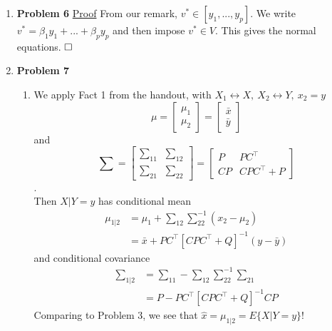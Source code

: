 \documentclass[letterpaper]{article}
\begin{document}
\begin{enumerate}
\begin{enumerate}
\underline{Remark} $v^* \perp [y_1, ..., y_p]^\perp \iff v^* \in ([y_1, ..., y_p]^\perp)^\perp \iff v^* \in [y_1, ..., y_p]$\\

\underline{Because} $\mathcal{X} = [y_1, ..., y_p] \oplus [y_1, ..., y_p]^\perp \hfill \bigtriangleup$\\


\end{enumerate}


\vspace*{1cm}

\item \textbf{Problem 6} \underline{Proof} From our remark, $v^* \in [y_1, ..., y_p]$. We write $v^* = \beta_1 y_1 + ... +\beta_p y_p$ and then impose $v^* \in V$. This gives the normal equations. $\hfill \square$
    
    \vspace*{1cm}

\item \textbf{Problem 7}
\begin{enumerate}
\setlength{\itemsep}{.1in}
\renewcommand{\labelenumi}{(\alph{enumi})}
\item We apply Fact 1 from the handout, with $X_1 \leftrightarrow X, ~X_2 \leftrightarrow Y, ~x_2 = y$
$$\mu = \begin{bmatrix} \mu_1 \\ \mu_2 \end{bmatrix} = \begin{bmatrix} \bar{x} \\ \bar{y}\end{bmatrix}$$
and $$\sum = \left[\begin{array}{cc}
\sum_{11} & \sum_{12} \\
\sum_{21} & \sum_{22} \end{array}\right] =
\left[\begin{array}{cc}
P & PC^\top \\
CP & CPC^\top +P \end{array}\right]$$.\\

Then $X|Y=y$ has conditional mean
$$\begin{aligned}
\mu_{1|2} &= \mu_1 + \textstyle \sum_{12} \sum_{22}^{-1}(x_2-\mu_2) \\
&= \bar{x} + PC^\top[CPC^\top +Q]^{-1}(y-\bar{y})
\end{aligned}$$
and conditional covariance
$$\begin{aligned}
\textstyle \sum_{1|2} &= \textstyle \sum_{11} - \sum_{12} \sum_{22}^{-1} \sum_{21} \\
&= P-PC^\top [CPC^\top+Q]^{-1}CP \end{aligned}$$
Comparing to Problem 3, we see that $\hat{x} = \mu_{1|2} = E\{X|Y=y\}$!


\end{enumerate}
\end{enumerate}
\end{document}
